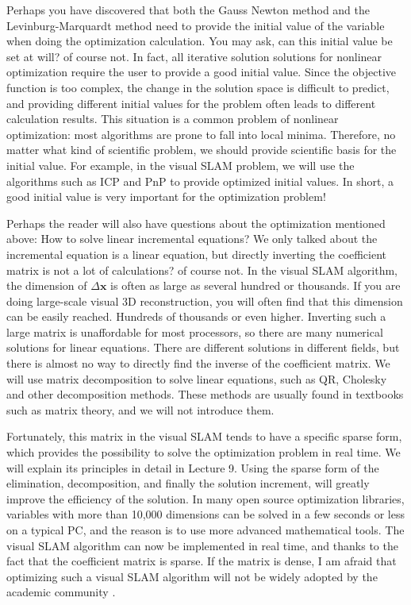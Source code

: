 Perhaps you have discovered that both the Gauss Newton method and the Levinburg-Marquardt method need to provide the initial value of the variable when doing the optimization calculation. You may ask, can this initial value be set at will? of course not. In fact, all iterative solution solutions for nonlinear optimization require the user to provide a good initial value. Since the objective function is too complex, the change in the solution space is difficult to predict, and providing different initial values ​​for the problem often leads to different calculation results. This situation is a common problem of nonlinear optimization: most algorithms are prone to fall into local minima. Therefore, no matter what kind of scientific problem, we should provide scientific basis for the initial value. For example, in the visual SLAM problem, we will use the algorithms such as ICP and PnP to provide optimized initial values. In short, a good initial value is very important for the optimization problem!

Perhaps the reader will also have questions about the optimization mentioned above: How to solve linear incremental equations? We only talked about the incremental equation is a linear equation, but directly inverting the coefficient matrix is ​​not a lot of calculations? of course not. In the visual SLAM algorithm, the dimension of $\Delta \bm{x}$ is often as large as several hundred or thousands. If you are doing large-scale visual 3D reconstruction, you will often find that this dimension can be easily reached. Hundreds of thousands or even higher. Inverting such a large matrix is ​​unaffordable for most processors, so there are many numerical solutions for linear equations. There are different solutions in different fields, but there is almost no way to directly find the inverse of the coefficient matrix. We will use matrix decomposition to solve linear equations, such as QR, Cholesky and other decomposition methods. These methods are usually found in textbooks such as matrix theory, and we will not introduce them.

Fortunately, this matrix in the visual SLAM tends to have a specific sparse form, which provides the possibility to solve the optimization problem in real time. We will explain its principles in detail in Lecture 9. Using the sparse form of the elimination, decomposition, and finally the solution increment, will greatly improve the efficiency of the solution. In many open source optimization libraries, variables with more than 10,000 dimensions can be solved in a few seconds or less on a typical PC, and the reason is to use more advanced mathematical tools. The visual SLAM algorithm can now be implemented in real time, and thanks to the fact that the coefficient matrix is ​​sparse. If the matrix is ​​dense, I am afraid that optimizing such a visual SLAM algorithm will not be widely adopted by the academic community \textsuperscript{\cite{Lourakis2009, Sibley2009a, Triggs2000 }}.

